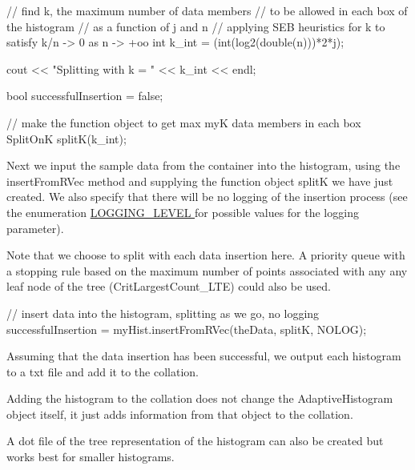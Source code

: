 \begin{DoxyCodeInclude}
        // find k, the maximum number of data members
        // to be allowed in each box of the histogram
        // as a function of j and n
        // applying SEB heuristics for k to satisfy k/n -> 0 as n -> +oo
        int k_int = (int(log2(double(n)))*2*j);

        cout << "Splitting with k = " << k_int << endl;

        bool successfulInsertion = false;

        // make the function object to get max myK data members in each box
        SplitOnK splitK(k_int);

\end{DoxyCodeInclude}


\-Next we input the sample data from the container into the histogram, using the insert\-From\-R\-Vec method and supplying the function object split\-K we have just created. \-We also specify that there will be no logging of the insertion process (see the enumeration \hyperlink{namespacesubpavings_aef8e51096b59ecaf1a1e9b2ee24b6089}{\-L\-O\-G\-G\-I\-N\-G\-\_\-\-L\-E\-V\-E\-L } for possible values for the logging parameter).

\-Note that we choose to split with each data insertion here. \-A priority queue with a stopping rule based on the maximum number of points associated with any any leaf node of the tree (\-Crit\-Largest\-Count\-\_\-\-L\-T\-E) could also be used.


\begin{DoxyCodeInclude}
        // insert data into the histogram, splitting as we go, no logging
        successfulInsertion = myHist.insertFromRVec(theData, splitK, NOLOG);

\end{DoxyCodeInclude}


\-Assuming that the data insertion has been successful, we output each histogram to a txt file and add it to the collation.

\-Adding the histogram to the collation does not change the \-Adaptive\-Histogram object itself, it just adds information from that object to the collation.

\-A dot file of the tree representation of the histogram can also be created but works best for smaller histograms.


